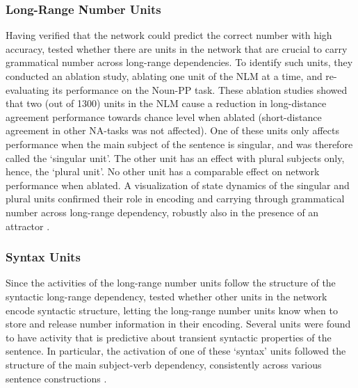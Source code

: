 \subsubsection{Long-Range Number Units}
Having verified that the network could predict the correct number with high accuracy, \citet{lakretz2019emergence} tested whether there are units in the network that are crucial to carry grammatical number across long-range dependencies.  
To identify such units, they conducted an ablation study, ablating one unit of the NLM at a time, and re-evaluating its performance on the Noun-PP task. 
These ablation studies showed that two (out of 1300) units in the NLM cause a reduction in long-distance agreement performance towards chance level when ablated (short-distance agreement in other NA-tasks was not affected). 
One of these units only affects performance when the main subject of the sentence is singular, and was therefore called the `singular unit'. 
The other unit has an effect with plural subjects only, hence, the `plural unit'. 
No other unit has a comparable effect on network performance when ablated. 
A visualization of state dynamics of the singular and plural units confirmed their role in encoding and carrying through grammatical number across long-range dependency, robustly also in the presence of an attractor \citep[figure 1 in][]{lakretz2019emergence}.

\subsubsection{Syntax Units}
Since the activities of the long-range number units follow the structure of the syntactic long-range dependency, \citet{lakretz2019emergence} tested whether other units in the network encode syntactic structure, letting the long-range number units know when to store and release number information in their encoding. Several units were found to have activity that is predictive about transient syntactic properties of the sentence. In particular, the activation of one of these `syntax' units followed the structure of the main subject-verb dependency, consistently across various sentence constructions \citep[figure 3 in][]{lakretz2019emergence}.

